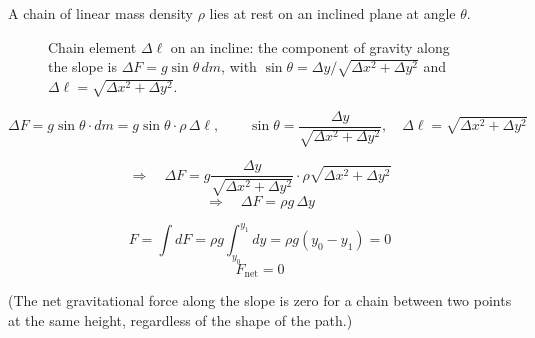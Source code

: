 \begin{example}
A chain of linear mass density $\rho$ lies at rest on an inclined plane at angle $\theta$.

\begin{figure}[H]
  \centering
  \caption{Chain element $\Delta\ell$ on an incline: the component of gravity along the slope is $\Delta F = g\sin\theta\,dm$, with $\sin\theta = \Delta y/\sqrt{\Delta x^2+\Delta y^2}$ and $\Delta\ell = \sqrt{\Delta x^2+\Delta y^2}$.}
\end{figure}

\[
  \Delta F = g\sin\theta\cdot dm = g\sin\theta\cdot\rho\,\Delta\ell, \qquad
  \sin\theta = \frac{\Delta y}{\sqrt{\Delta x^2+\Delta y^2}}, \quad \Delta\ell = \sqrt{\Delta x^2+\Delta y^2}
\]

\[
  \Rightarrow \quad \Delta F = g\frac{\Delta y}{\sqrt{\Delta x^2+\Delta y^2}}\cdot\rho\sqrt{\Delta x^2+\Delta y^2}
\]
\[
  \Rightarrow \quad \Delta F = \rho g\,\Delta y
\]

\[
  F = \int dF = \rho g\int_{y_0}^{y_1} dy = \rho g(y_0 - y_1) = 0
\]
\[
  \boxed{F_\text{net} = 0}
\]

(The net gravitational force along the slope is zero for a chain between two points at the same height, regardless of the shape of the path.)
\end{example}

